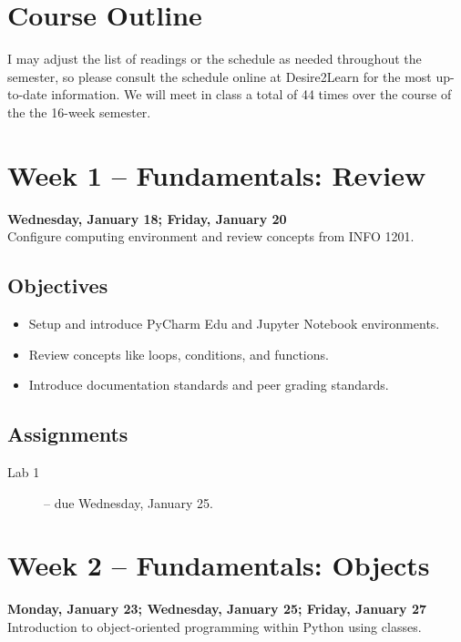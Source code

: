 \documentclass[10pt]{memoir}
\begin{document}

\newpage
\section{\textbf{Course Outline}}

I may adjust the list of readings or the schedule as needed throughout the semester, so please consult the schedule online at Desire2Learn for the most up-to-date information. We will meet in class a total of 44 times over the course of the the 16-week semester.


\section{Week 1 -- Fundamentals: Review}
\textcolor{CUGold}{\textbf{Wednesday, January 18; Friday, January 20}}\\
Configure computing environment and review concepts from INFO 1201. %
    
    \subsection{Objectives}
    \begin{itemize}
        \item Setup and introduce PyCharm Edu and Jupyter Notebook environments.
        \item Review concepts like loops, conditions, and functions.
        \item Introduce documentation standards and peer grading standards.
    \end{itemize}
    
    \subsection{Assignments}
    \begin{description}
        \item[Lab 1 ] -- due Wednesday, January 25. 
    \end{description}

\section{Week 2 -- Fundamentals: Objects}
\textcolor{CUGold}{\textbf{Monday, January 23; Wednesday, January 25; Friday, January 27}}\\
Introduction to object-oriented programming within Python using classes.
    
\end{document}
